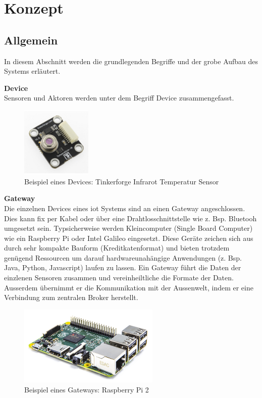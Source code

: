 \chapter{Konzept}
\label{chap:konzept}


\section{Allgemein}

In diesem Abschnitt werden die grundlegenden Begriffe und der grobe Aufbau des Systems erläutert.

\textbf{Device} \\
Sensoren und Aktoren werden unter dem Begriff Device zusammengefasst.

\begin{figure}[H]
	\centering
		\includegraphics[width=0.3\textwidth]{bilder/bricklet_temperature_ir.jpg}
	\caption{Beispiel eines Devices: Tinkerforge Infrarot Temperatur Sensor}
\end{figure}


\textbf{Gateway} \\
Die einzelnen Devices eines \gls{iot} Systems sind an einen Gateway angeschlossen. Dies kann fix per Kabel oder über eine Drahtlosschnittstelle wie z. Bsp. Bluetooh umgesetzt sein. Typsicherweise werden Kleincomputer (Single Board Computer) wie ein Raspberry Pi oder Intel Galileo eingesetzt. Diese Geräte zeichen sich aus durch sehr kompakte Bauform (Kreditkatenformat) und bieten trotzdem genügend Ressourcen um darauf hardwareunahängige Anwendungen (z. Bsp. Java, Python, Javascript) laufen zu lassen. 
Ein Gateway führt die Daten der einzlenen Sensoren zusammen und vereinheiltliche die Formate der Daten. Ausserdem übernimmt er die Kommunikation mit der Aussenwelt, indem er eine Verbindung zum zentralen Broker herstellt.

\begin{figure}[H]
	\centering
		\includegraphics[width=0.6\textwidth]{bilder/raspi_2.jpg}
	\caption{Beispiel eines Gateways: Raspberry Pi 2}
\end{figure}

